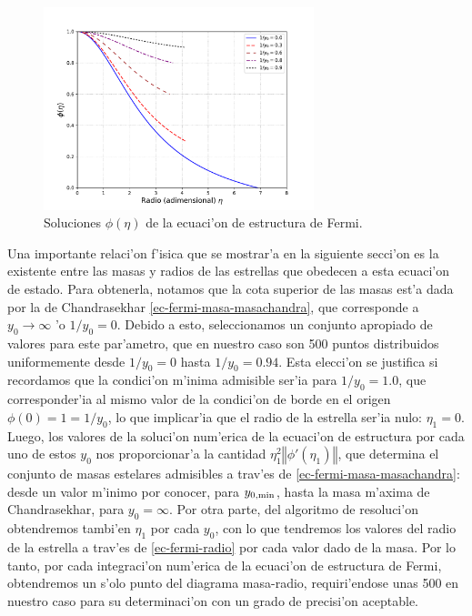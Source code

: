 \begin{figure}[H]
\centering
\includegraphics[angle=0,width=0.7\textwidth]{fig/fig-fermi-soluciones.pdf}
\caption{Soluciones $\phi(\eta)$ de la ecuaci'on de estructura de Fermi.}\label{grafico-fermi-soluciones}
\end{figure}



Una importante relaci'on f'isica que se mostrar'a en la siguiente secci'on es la existente entre las masas y radios de las estrellas que obedecen a esta ecuaci'on de estado. Para obtenerla, notamos que la cota superior de las masas est'a dada por la de Chandrasekhar \eqref{ec-fermi-masa-masachandra}, que corresponde a $y_0\to\infty$ 'o $1/y_0=0$. Debido a esto, seleccionamos un conjunto apropiado de valores para este par'ametro, que en nuestro caso son 500 puntos distribuidos uniformemente desde $1/y_0=0$ hasta $1/y_0=0.94$. Esta elecci'on se justifica si recordamos que la condici'on m'inima admisible ser'ia para $1/y_0=1.0$, que corresponder'ia al mismo valor de la condici'on de borde en el origen $\phi(0)=1=1/y_0$, lo que implicar'ia que el radio de la estrella ser'ia nulo: $\eta_1=0$. Luego, los valores de la soluci'on num'erica de la ecuaci'on de estructura por cada uno de estos $y_0$ nos proporcionar'a la cantidad $\eta_1^2\left\Vert\phi'(\eta_1)\right\Vert$, que determina el conjunto de masas estelares admisibles a trav'es de \eqref{ec-fermi-masa-masachandra}: desde un valor m'inimo por conocer, para $y_{\rm 0,min}$, hasta la masa m'axima de Chandrasekhar, para $y_0=\infty$. Por otra parte, del algoritmo de resoluci'on obtendremos tambi'en $\eta_1$ por cada $y_0$, con lo que tendremos los valores del radio de la estrella a trav'es de \eqref{ec-fermi-radio} por cada valor dado de la masa. Por lo tanto, por cada integraci'on num'erica de la ecuaci'on de estructura de Fermi, obtendremos un s'olo punto del diagrama masa-radio, requiri'endose unas 500 en nuestro caso para su determinaci'on con un grado de precisi'on aceptable.

